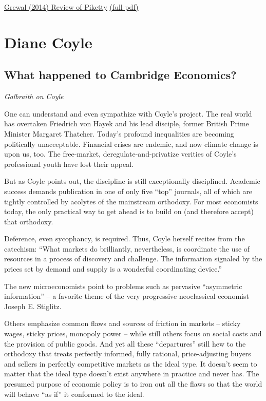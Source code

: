 \documentclass[
]{book}
\begin{document}
\href{https://harvardlawreview.org/2014/12/the-laws-of-capitalism/}{Grewal (2014) Review of Piketty}
\href{pdf/Grewal_2014_laws_of_Capitalism.pdf}{(full pdf)}

\hypertarget{diane-coyle}{%
\section{Diane Coyle}\label{diane-coyle}}

\hypertarget{what-happened-to-cambridge-economics}{%
\subsection{What happened to Cambridge Economics?}\label{what-happened-to-cambridge-economics}}

\emph{Galbraith on Coyle}

One can understand and even sympathize with Coyle's project. The real world has overtaken Friedrich von Hayek and his lead disciple, former British Prime Minister Margaret Thatcher. Today's profound inequalities are becoming politically unacceptable. Financial crises are endemic, and now climate change is upon us, too. The free-market, deregulate-and-privatize verities of Coyle's professional youth have lost their appeal.

But as Coyle points out, the discipline is still exceptionally disciplined. Academic success demands publication in one of only five ``top'' journals, all of which are tightly controlled by acolytes of the mainstream orthodoxy. For most economists today, the only practical way to get ahead is to build on (and therefore accept) that orthodoxy.

Deference, even sycophancy, is required. Thus, Coyle herself recites from the catechism: ``What markets do brilliantly, nevertheless, is coordinate the use of resources in a process of discovery and challenge. The information signaled by the prices set by demand and supply is a wonderful coordinating device.''

The new microeconomists point to problems such as pervasive ``asymmetric information'' -- a favorite theme of the very progressive neoclassical economist Joseph E. Stiglitz.

Others emphasize common flaws and sources of friction in markets -- sticky wages, sticky prices, monopoly power -- while still others focus on social costs and the provision of public goods. And yet all these ``departures'' still hew to the orthodoxy that treats perfectly informed, fully rational, price-adjusting buyers and sellers in perfectly competitive markets as the ideal type. It doesn't seem to matter that the ideal type doesn't exist anywhere in practice and never has. The presumed purpose of economic policy is to iron out all the flaws so that the world will behave ``as if'' it conformed to the ideal.
\end{document}
